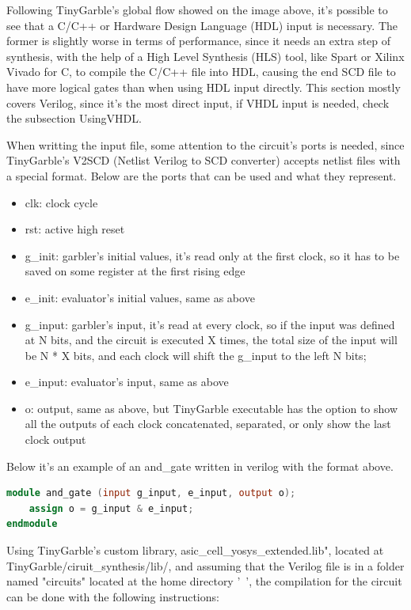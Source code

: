 \begin{refsection}
Following TinyGarble's global flow showed on the image above, it's possible to see that a C/C++ or Hardware Design Language (HDL) input is necessary. The former is slightly worse in terms of performance, since it needs an extra step of synthesis, with the help of a High Level Synthesis (HLS) tool, like Spart or Xilinx Vivado for C, to compile the C/C++ file into HDL, causing the end SCD file to have more logical gates than when using HDL input directly. This section mostly covers Verilog, since it's the most direct input, if VHDL input is needed, check the subsection UsingVHDL.

When writting the input file, some attention to the circuit's ports is needed, since TinyGarble's V2SCD (Netlist Verilog to SCD converter) accepts netlist files with a special format.
Below are the ports that can be used and what they represent.

\begin{itemize}
\item clk: clock cycle
\item rst: active high reset
\item g\_init: garbler's initial values, it's read only at the first clock, so it has to be saved on some register at the first rising edge
\item e\_init: evaluator's initial values, same as above
\item g\_input: garbler's input, it's read at every clock, so if the input was defined at N bits, and the circuit is executed X times, the total size of the input will be N * X bits, and each clock will shift the g\_input to the left N bits;
\item e\_input: evaluator's input, same as above
\item o: output, same as above, but TinyGarble executable has the option to show all the outputs of each clock concatenated, separated, or only show the last clock output
\end{itemize}

\newpage

Below it's an example of an and\_gate written in verilog with the format above.

\begin{lstlisting}[caption={and\_gate.v}, language=Verilog, captionpos=b]
module and_gate (input g_input, e_input, output o);
	assign o = g_input & e_input;
endmodule
\end{lstlisting}

Using TinyGarble's custom library, asic\_cell\_yosys\_extended.lib", located at TinyGarble/ciruit\_synthesis/lib/, and assuming that the Verilog file is in a folder named "circuits" located at the home directory '~', the compilation for the circuit can be done with the following instructions:


\end{refsection}
